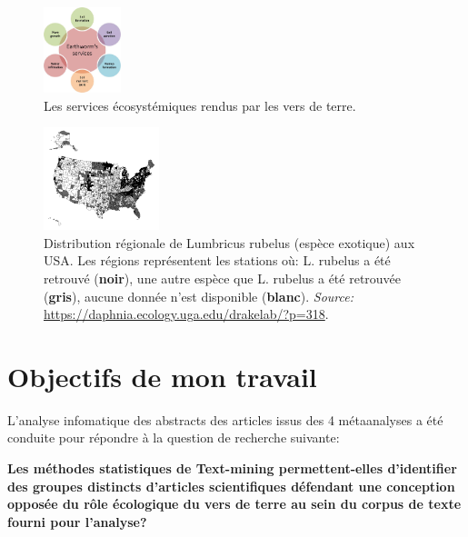 \documentclass{book}
\begin{document}
\begin{figure}[H] %
    \begin{center} %
        \includegraphics[width=0.2\textwidth]{EW_services.png}
        \caption{Les services écosystémiques rendus par les vers de terre.}\label{fig_wormsservices}
    \end{center}
\end{figure}

\begin{figure}[H] %
    \begin{center} %
        \includegraphics[width=0.3\textwidth]{worm-map.png}
        \caption[Distribution régionale de Lumbricus rubelus (espèce exotique) aux USA.]{Distribution régionale de Lumbricus rubelus (espèce exotique) aux USA. Les régions représentent les stations où: L. rubelus a été retrouvé (\textbf{noir}), une autre espèce que L. rubelus a été retrouvée (\textbf{gris}), aucune donnée n'est disponible (\textbf{blanc}).  \textit{Source:} \url{https://daphnia.ecology.uga.edu/drakelab/?p=318}.}\label{fig_wormmap}
    \end{center} 
\end{figure}

\section{Objectifs de mon travail}

\noindent
L'analyse infomatique des abstracts des articles issus des 4 métaanalyses a été conduite pour répondre à la question de recherche suivante:


\vspace{\baselineskip}
\noindent
\textbf{Les méthodes statistiques de Text-mining permettent-elles d'identifier des groupes distincts d'articles scientifiques défendant une conception opposée du rôle écologique du vers de terre au sein du corpus de texte fourni pour l'analyse?}
\end{document}
